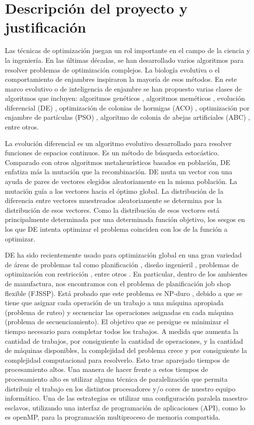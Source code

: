 \section{Descripción del proyecto y justificación} 

Las técnicas de optimización juegan un rol importante en el campo de la ciencia y la ingeniería. En las últimas décadas, se han desarrollado varios algoritmos para resolver problemas de optimización complejos. La biología evolutiva o el comportamiento de enjambres inspiraron la mayoría de esos métodos. En este marco evolutivo o de inteligencia de enjambre se han propuesto varias clases de algoritmos que incluyen: algoritmos genéticos \cite{Goldberg, Holland3}, algoritmos meméticos \cite{Moscato}, evolución diferencial (DE) \cite{StornPrice2}, optimización de colonias de hormigas (ACO) \cite{Colorni}, optimización por enjambre de partículas (PSO) \cite{Eberhart}, algoritmo de colonia de abejas artificiales (ABC) \cite{KarabogaBasturk}, entre otros.


La evolución diferencial es un algoritmo evolutivo desarrollado para resolver funciones de espacios continuos. Es un método de búsqueda estocástico. Comparado con otros algoritmos metaheurísticos basados en población, DE enfatiza más la mutación que la recombinación. DE muta un vector con una ayuda de pares de vectores elegidos aleatoriamente en la misma población. La mutación guía a los vectores hacia el óptimo global. La distribución de la diferencia entre vectores muestreados aleatoriamente se determina por la distribución de esos vectores. Como la distribución de esos vectores está principalmente determinada por una determinada función objetivo, los sesgos en los que DE intenta optimizar el problema coinciden con los de la función a optimizar.


DE ha sido recientemente usado para optimización global en una gran variedad de áreas de problemas tal como planificación \cite{Gnanavel}, diseño ingenieril \cite{Melo}, problemas de optimización con restricción \cite{Ali}, entre otros \cite{Juang,Yang}. En particular, dentro de los ambientes de manufactura, nos encontramos con el problema de planificación job shop flexible (FJSSP). Está probado que este problema es NP-duro \cite{GareyJohnson}, debido a que se tiene que asignar cada operación de un trabajo a una máquina apropiada (problema de ruteo) y secuenciar las operaciones asignadas en cada máquina (problema de secuenciamiento). El objetivo que se persigue es minimizar el tiempo necesario para completar todos los trabajos. A medida que aumenta la cantidad de trabajos, por consiguiente la cantidad de operaciones, y la cantidad de máquinas disponibles, la complejidad del problema crece y por consiguiente la complejidad computacional para resolverlo. Esto trae aparejado tiempos de procesamiento altos. Una manera de hacer frente a estos tiempos de  procesamiento alto es utilizar alguna técnica de paralelización que permita distribuir el trabajo en los distintos procesadores y/o cores de nuestro equipo informático. Una de las estrategias es utilizar una configuración paralela maestro-esclavos, utilizando una interfaz de programación de aplicaciones (API), como lo es openMP, para la programación multiproceso de memoria compartida.


